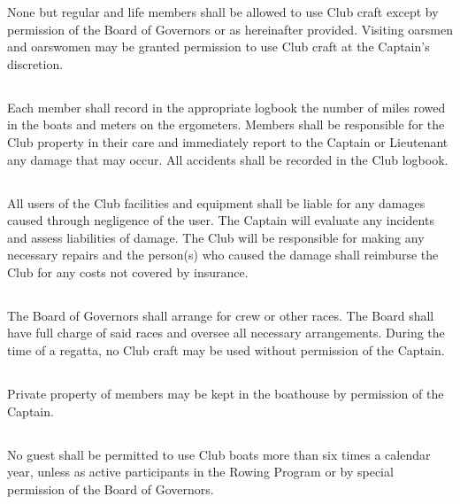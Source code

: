 \documentclass[11pt,american,letterpaper,]{constitution}
\begin{document}
None but regular and life members shall be allowed to use Club craft except by permission of the Board of Governors or as hereinafter provided. Visiting oarsmen and oarswomen may be granted permission to use Club craft at the Captain's discretion.

\subsection[Logbook]{} 

Each member shall record in the appropriate logbook the number of miles rowed in the boats and meters on the ergometers. Members shall be responsible for the Club property in their care and immediately report to the Captain or Lieutenant any damage that may occur. All accidents shall be recorded in the Club logbook.

\subsection[Damages]{} 

All users of the Club facilities and equipment shall be liable for any damages caused through negligence of the user. The Captain will evaluate any incidents and assess liabilities of damage. The Club will be responsible for making any necessary repairs and the person(s) who caused the damage shall reimburse the Club for any costs not covered by insurance.

\subsection[Regattas]{} 

The Board of Governors shall arrange for crew or other races. The Board shall have full charge of said races and oversee all necessary arrangements. During the time of a regatta, no Club craft may be used without permission of the Captain.

\subsection[Private Property]{} 

Private property of members may be kept in the boathouse by permission of the Captain.

\subsection[Guests]{} 

No guest shall be permitted to use Club boats more than six times a calendar year, unless as active participants in the Rowing Program or by special permission of the Board of Governors.
\end{document}
